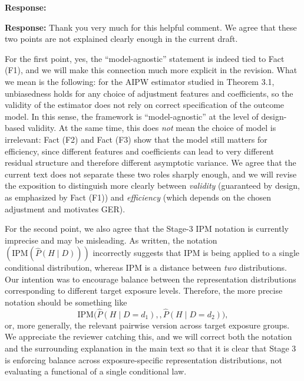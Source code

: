 \documentclass{article}
\theoremstyle{plain}
\theoremstyle{definition}
\theoremstyle{remark}
\begin{document}
\noindent\textbf{Response:}

\noindent\textbf{Response:} Thank you very much for this helpful comment. We agree that these two points are not explained clearly enough in the current draft.

For the first point, yes, the “model-agnostic” statement is indeed tied to Fact (F1), and we will make this connection much more explicit in the revision. What we mean is the following: for the AIPW estimator studied in Theorem 3.1, unbiasedness holds for any choice of adjustment features and coefficients, so the validity of the estimator does not rely on correct specification of the outcome model. In this sense, the framework is “model-agnostic” at the level of design-based validity. At the same time, this does \emph{not} mean the choice of model is irrelevant: Fact (F2) and Fact (F3) show that the model still matters for efficiency, since different features and coefficients can lead to very different residual structure and therefore different asymptotic variance. We agree that the current text does not separate these two roles sharply enough, and we will revise the exposition to distinguish more clearly between \emph{validity} (guaranteed by design, as emphasized by Fact (F1)) and \emph{efficiency} (which depends on the chosen adjustment and motivates GER). 

For the second point, we also agree that the Stage-3 IPM notation is currently imprecise and may be misleading. As written, the notation $(\mathrm{IPM}(\widehat P(H\mid D)))$ incorrectly suggests that IPM is being applied to a single conditional distribution, whereas IPM is a distance between \emph{two} distributions. Our intention was to encourage balance between the representation distributions corresponding to different target exposure levels. Therefore, the more precise notation should be something like
\[
\mathrm{IPM}\bigl(\widehat P(H \mid D=d_1),, \widehat P(H \mid D=d_2)\bigr),
\]
or, more generally, the relevant pairwise version across target exposure groups. We appreciate the reviewer catching this, and we will correct both the notation and the surrounding explanation in the main text so that it is clear that Stage 3 is enforcing balance across exposure-specific representation distributions, not evaluating a functional of a single conditional law.

\end{document}
